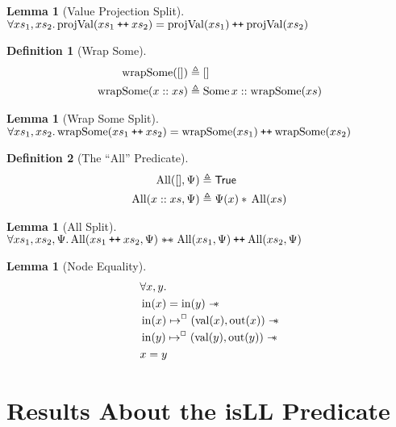 \documentclass[a4paper, 10pt]{report}
\theoremstyle{definition}
\newtheorem{lemma}[theorem]{Lemma}
\newtheorem{definition}{Definition}[section]
\newcommand{\AllP}{\operatorname{All}}
\newcommand{\projval}{\operatorname{projVal}}
\newcommand{\wrapsome}{\operatorname{wrapSome}}
\newcommand{\nIn}[1]{\operatorname{in}(#1)}
\newcommand{\nVal}[1]{\operatorname{val}(#1)}
\newcommand{\nOut}[1]{\operatorname{out}(#1)}
\newcommand\catenate{\mathbin{\text{\ttfamily\upshape ++}}}
\newcommand{\isNode}[1]{\nIn{#1} \mapsto^{\persistently} (\nVal{#1}, \nOut{#1})}
\begin{document}
\begin{lemma}[Value Projection Split]\label{lemma:value-proj-split}
  $\All xs_1, xs_2.\\
  \projval(xs_1 \catenate xs_2) = \projval(xs_1) \catenate \projval(xs_2)$
\end{lemma}

\begin{definition}[Wrap Some]\label{COMMON:Def:wrap-some}
  \begin{align*}
    \wrapsome([]) &\eqdef []\\
    \wrapsome(x :: xs) &\eqdef \Some{x} :: \wrapsome(xs)
  \end{align*}
\end{definition}

\begin{lemma}[Wrap Some Split]\label{lemma:wrap-some-split}
  $\All xs_1, xs_2.\\
  \wrapsome(xs_1 \catenate xs_2) = \wrapsome(xs_1) \catenate \wrapsome(xs_2)$
\end{lemma}


\begin{definition}[The ``All'' Predicate]\label{COMMON:Def:All}
  \begin{align*}
    \AllP([], \Psi) &\eqdef \TRUE\\
    \AllP(x :: xs, \Psi) &\eqdef \Psi(x) \star{} \AllP(xs)
  \end{align*}
\end{definition}

\begin{lemma}[All Split]\label{lemma:all-split}
  $\All xs_1, xs_2, \Psi.\\
  \AllP(xs_1 \catenate xs_2, \Psi) \wandIff \AllP(xs_1, \Psi) \catenate \AllP(xs_2, \Psi)$
\end{lemma}


\begin{lemma}[Node Equality]\label{lemma:nIn-equal}
  \begin{align*}
    &\All x, y.\\
    &\nIn{x} = \nIn{y} \wand\\
    &\isNode{x} \wand\\
    &\isNode{y} \wand\\
    &x = y
  \end{align*}
\end{lemma}

\section{Results About the isLL Predicate}
\label{appendix:common:section:isll}
\end{document}
